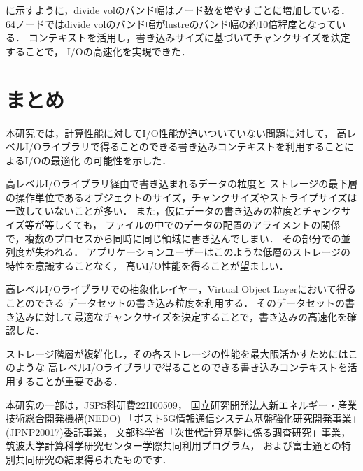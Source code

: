 \documentclass[submit,techrep,noauthor]{ipsj}
\begin{document}
に示すように，divide volのバンド幅はノード数を増やすごとに増加している．
64ノードではdivide volのバンド幅がlustreのバンド幅の約10倍程度となっている．
コンテキストを活用し，書き込みサイズに基づいてチャンクサイズを決定することで，
I/Oの高速化を実現できた．

\section{まとめ}
本研究では，計算性能に対してI/O性能が追いついていない問題に対して，
高レベルI/Oライブラリで得ることのできる書き込みコンテキストを利用することによるI/Oの最適化
の可能性を示した．

高レベルI/Oライブラリ経由で書き込まれるデータの粒度と
ストレージの最下層の操作単位であるオブジェクトのサイズ，チャンクサイズやストライプサイズは一致していないことが多い．
また，仮にデータの書き込みの粒度とチャンクサイズ等が等しくても，
ファイルの中でのデータの配置のアライメントの関係で，複数のプロセスから同時に同じ領域に書き込んでしまい．
その部分での並列度が失われる．
アプリケーションユーザーはこのような低層のストレージの特性を意識することなく，
高いI/O性能を得ることが望ましい．

高レベルI/Oライブラリでの抽象化レイヤー，Virtual Object Layerにおいて得ることのできる
データセットの書き込み粒度を利用する．
そのデータセットの書き込みに対して最適なチャンクサイズを決定することで，書き込みの高速化を確認した．

ストレージ階層が複雑化し，その各ストレージの性能を最大限活かすためにはこのような
高レベルI/Oライブラリで得ることのできる書き込みコンテキストを活用することが重要である．

\begin{acknowledgment}
	本研究の一部は，JSPS科研費22H00509，
	国立研究開発法人新エネルギー・産業技術総合開発機構(NEDO)
	「ポスト5G情報通信システム基盤強化研究開発事業」(JPNP20017)委託事業，
	文部科学省「次世代計算基盤に係る調査研究」事業，
	筑波大学計算科学研究センター学際共同利用プログラム，
	および富士通との特別共同研究の結果得られたものです．
\end{acknowledgment}



\end{document}
